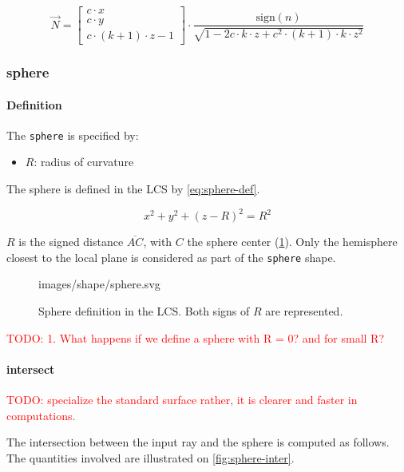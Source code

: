 \begin{equation}
\overrightarrow{N} =
\begin{bmatrix}
c \cdot x \\ c \cdot y \\ c \cdot (k+1) \cdot z - 1
\end{bmatrix} \cdot
\frac{\textrm{sign}(n)}{
\sqrt{1 - 2 c \cdot k \cdot z + c^2 \cdot (k+1) \cdot k \cdot z^2}}
\end{equation}

\subsubsection{sphere}

\paragraph{Definition}
The \lstinline{sphere} is specified by:

\begin{itemize}
\item $R$: radius of curvature
\end{itemize}

The sphere is defined in the \gls{LCS} by \cref{eq:sphere-def}.

\begin{equation} \label{eq:sphere-def}
x^2 + y^2 + (z - R)^2 = R^2
\end{equation}

$R$ is the signed distance $\overline{AC}$, with $C$ the sphere center
(\cref{fig:sphere-def-lcs}). Only the hemisphere closest to the local plane
is considered as part of the \lstinline{sphere} shape.

\begin{figure} \caption{\label{fig:sphere-def-lcs} Sphere definition
in the LCS. Both signs of $R$ are represented.}

           {images/shape/sphere.svg}
\end{figure}

\textcolor{red}{TODO:
1. What happens if we define a sphere with R = 0? and for small R?
}

\paragraph{intersect}
\textcolor{red}{TODO: specialize the standard surface rather, it is clearer
and faster in computations.}

The intersection between the input ray and the sphere is computed as
follows. The quantities involved are illustrated on \cref{fig:sphere-inter}.

